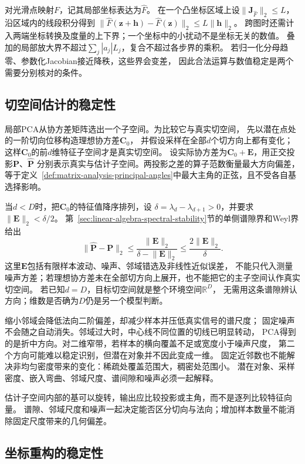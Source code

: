 对光滑点映射$F$，记其局部坐标表达为$\widehat F$。
在一个凸坐标区域上设$\lVert\bm J_{\widehat F}\rVert_2\leq L$，
沿区域内的线段积分得到
$\lVert\widehat F(\bm z+\bm h)-\widehat F(\bm z)\rVert_2
\leq L\lVert\bm h\rVert_2$。
跨图时还需计入两端坐标转换及度量的上下界；一个坐标中的小扰动不是坐标无关的数值。
叠加的局部放大界不超过$\sum_j|a_j|L_j$，复合不超过各步界的乘积。
若归一化分母趋零、参数化Jacobian接近降秩，这些界会变差，
因此合法运算与数值稳定是两个需要分别核对的条件。

\subsection{切空间估计的稳定性}
\label{sec:geometry-tangent-estimate-stability}

局部PCA从协方差矩阵选出一个子空间。为比较它与真实切空间，
先以潜在点处的一阶切向位移构造理想协方差$\bm C_0$，
并假设采样在全部$d$个切方向上都有变化；这样$\bm C_0$的前$d$维特征子空间才是真实切空间。
设实际协方差为$\bm C_0+\bm E$，用正交投影$\bm P$、$\widehat{\bm P}$
分别表示真实与估计子空间。两投影之差的算子范数衡量最大方向偏差，
等于定义~\ref{def:matrix-analysis-principal-angles}中最大主角的正弦，且不受各自基选择影响。

当$d<D$时，把$\bm C_0$的特征值降序排列，设
$\delta=\lambda_d-\lambda_{d+1}>0$，并要求$\lVert\bm E\rVert_2<\delta/2$。
第~\ref{sec:linear-algebra-spectral-stability}节的单侧谱隙界和Weyl界给出
\[
 \lVert\widehat{\bm P}-\bm P\rVert_2
 \leq\frac{\lVert\bm E\rVert_2}{\delta-\lVert\bm E\rVert_2}
 \leq\frac{2\lVert\bm E\rVert_2}{\delta}.
\]
这里$\bm E$包括有限样本波动、噪声、邻域错选及非线性近似误差，
不能只代入测量噪声方差；若理想协方差未在全部切方向上展开，也不能把它的主子空间认作真实切空间。
若已知$d=D$，目标切空间就是整个环境空间$\mathbb R^D$，
无需用这条谱隙辨认方向；维数是否确为$D$仍是另一个模型判断。

缩小邻域会降低法向二阶偏差，却减少样本并压低真实信号的谱尺度；
固定噪声不会随之自动消失。邻域过大时，中心线不同位置的切线已明显转动，
PCA得到的是折中方向。对二维窄带，若样本的横向覆盖不足或宽度小于噪声尺度，
第二个方向可能难以稳定识别，但潜在对象并不因此变成一维。
固定近邻数也不能解决非均匀密度带来的变化：稀疏处覆盖范围大，稠密处范围小。
潜在对象、采样密度、嵌入弯曲、邻域尺度、谱间隙和噪声必须一起解释。


估计子空间内部的基可以旋转，输出应比较投影或主角，而不是逐列比较特征向量。
谱隙、邻域尺度和噪声一起决定能否区分切向与法向；增加样本数量不能消除固定尺度带来的几何偏差。

\subsection{坐标重构的稳定性}
\label{sec:geometry-coordinate-reconstruction-stability}

